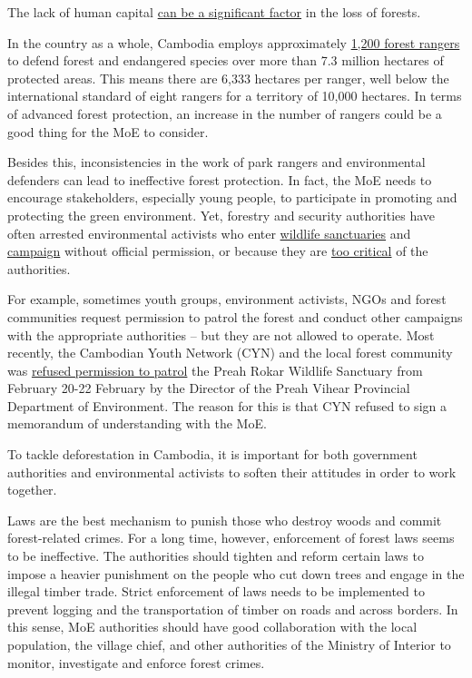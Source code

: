 \documentclass[10pt,a4paper]{letter}
\begin{document}
The lack of human capital \href{https://www.khmertimeskh.com/50781262/illegal-loggers-clear-30-hectares-of-forest-in-mondulkiri-province/}{can be a significant factor} in the loss of forests. 

In the country as a whole, Cambodia employs approximately \href{https://www.voacambodia.com/a/cambodia-s-rangers-risk-lives-protecting-environment/5771184.html}{1,200 forest rangers} to defend forest and endangered species over more than 7.3 million hectares of protected areas. This means there are 6,333 hectares per ranger, well below the international standard of eight rangers for a territory of 10,000 hectares. In terms of advanced forest protection, an increase in the number of rangers could be a good thing for the MoE to consider.

Besides this, inconsistencies in the work of park rangers and environmental defenders can lead to ineffective forest protection. In fact, the MoE needs to encourage stakeholders, especially young people, to participate in promoting and protecting the green environment. Yet, forestry and security authorities have often arrested environmental activists who enter \href{https://newint.org/features/2021/02/15/forest-defenders-under-fire-cambodia}{wildlife sanctuaries} and \href{https://www.rfa.org/english/news/cambodia/release-02082021175436.html}{campaign} without official permission, or because they are \href{https://www.khmertimeskh.com/50814434/supreme-court-turns-down-three-activists-bail-request/}{too critical} of the authorities.

For example, sometimes youth groups, environment activists, NGOs and forest communities request permission to patrol the forest and conduct other campaigns with the appropriate authorities -- but they are not allowed to operate. Most recently, the Cambodian Youth Network (CYN) and the local forest community was \href{https://www.facebook.com/borak.ma/posts/3268828009885906}{refused permission to patrol} the Preah Rokar Wildlife Sanctuary from February 20-22 February by the Director of the Preah Vihear Provincial Department of Environment. The reason for this is that CYN refused to sign a memorandum of understanding with the MoE.


To tackle deforestation in Cambodia, it is important for both government authorities and environmental activists to soften their attitudes in order to work together.

Laws are the best mechanism to punish those who destroy woods and commit forest-related crimes. For a long time, however, enforcement of forest laws seems to be ineffective. The authorities should tighten and reform certain laws to impose a heavier punishment on the people who cut down trees and engage in the illegal timber trade. Strict enforcement of laws needs to be implemented to prevent logging and the transportation of timber on roads and across borders. In this sense, MoE authorities should have good collaboration with the local population, the village chief, and other authorities of the Ministry of Interior to monitor, investigate and enforce forest crimes.
\end{document}
